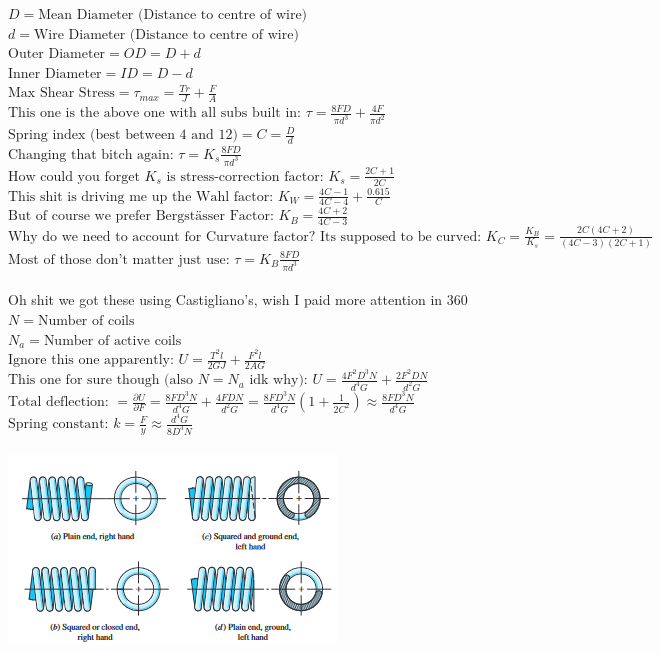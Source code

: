 \documentclass[11pt, fleqn]{article}
\begin{document}
$D = \text{Mean Diameter (Distance to centre of wire)}$\\
$d = \text{Wire Diameter (Distance to centre of wire)}$\\
$\text{Outer Diameter} = OD = D + d$\\
$\text{Inner Diameter} = ID = D - d$\\
$\text{Max Shear Stress} = \tau_{max} = \frac{Tr}{J} + \frac{F}{A}$\\
$\text{This one is the above one with all subs built in: }\tau = \frac{8FD}{\pi d^3} + \frac{4F}{\pi d^2}$\\
$\text{Spring index (best between 4 and 12)} = C = \frac{D}{d}$\\
$\text{Changing that bitch again: } \tau = K_s\frac{8FD}{\pi d^3}$\\
$\text{How could you forget $K_s$ is stress-correction factor: } K_s = \frac{2C + 1}{2C}$\\
$\text{This shit is driving me up the Wahl factor: } K_W = \frac{4C-1}{4C-4} + \frac{0.615}{C}$\\
$\text{But of course we prefer Bergstässer Factor: } K_B = \frac{4C+2}{4C-3}$\\
$\text{Why do we need to account for Curvature factor? Its supposed to be curved: } K_C = \frac{K_B}{K_s} = \frac{2C(4C+2)}{(4C-3)(2C+1)}$\\
$\text{Most of those don't matter just use: } \tau = K_B\frac{8FD}{\pi d^3}$\\
\\
Oh shit we got these using Castigliano's, wish I paid more attention in 360\\
$N = \text{Number of coils}$\\
$N_a = \text{Number of active coils}$\\
$\text{Ignore this one apparently: } U = \frac{T^2l}{2GJ} + \frac{F^2l}{2AG}$\\
$\text{This one for sure though (also $N = N_a$ idk why): } U = \frac{4F^2D^3N}{d^4G} + \frac{2F^2DN}{d^2G}$\\
$\text{Total deflection: } = \frac{\partial U}{\partial F} = \frac{8FD^3N}{d^4G} + \frac{4FDN}{d^2G} = \frac{8FD^3N}{d^4G}(1+\frac{1}{2C^2}) \approx \frac{8FD^3N}{d^4G}$\\
$\text{Spring constant: } k = \frac{F}{y} \approx \frac{d^4G}{8D^3N}$\\
\\
\includegraphics[scale=0.9]{Springs/Fig10-2.png}\\
\end{document}
